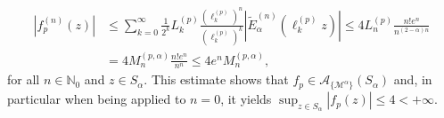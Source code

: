 \documentclass[11pt,a4paper]{article}
\theoremstyle{plain}
\theoremstyle{definition}
\newcommand{\NN}{\mathbb{N}}
\newcommand{\M}{\mathbb{M}}
\newcommand{\LL}{\mathbb{L}}
\newcommand{\G}{\mathbb{G}}
\begin{document}
\begin{align*}
	|f^{(n)}_{p}(z)|&\le\sum_{k= 0}^\infty\frac{1}{2^k}L^{(p)}_k\frac{(\ell^{(p)}_{k})^n}{(\ell^{(p)}_{k})^k}|\widetilde{E}_{\alpha}^{(n)}(\ell^{(p)}_{k}z)|\le 4L^{(p)}_n\frac{n!e^n}{n^{(2-\alpha)n}}
	\\&
	=4M^{(p,\alpha)}_n\frac{n!e^n}{n^n}\le 4e^nM^{(p,\alpha)}_n,
\end{align*}
for all $n\in\NN_0$ and $z\in S_{\alpha}$.
This estimate shows that $f_{p}\in\mathcal{A}_{\{\mathcal{M}^{\alpha}\}}(S_{\alpha})$ and, in particular when being applied to $n=0$, it yields $\sup_{z\in S_{\alpha}}|f_{p}(z)|\leq 4<+\infty$.
\end{document}
